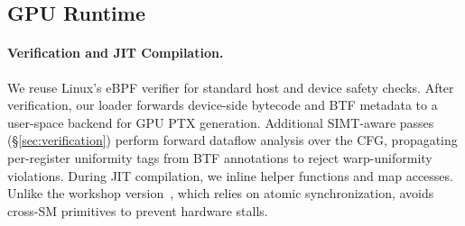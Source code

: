 \subsection{GPU Runtime}
\label{sec:impl-gpu}

\paragraph{Verification and JIT Compilation.}
We reuse Linux's eBPF verifier for standard host and device safety checks.
After verification, our loader forwards device-side bytecode and BTF metadata to a user-space backend for GPU PTX generation.
Additional SIMT-aware passes (\S\ref{sec:verification}) perform forward dataflow analysis over the CFG, propagating per-register uniformity tags from BTF annotations to reject warp-uniformity violations.
During JIT compilation, we inline helper functions and map accesses.
Unlike the workshop version~\cite{egpu}, which relies on atomic synchronization, \sys{} avoids cross-SM primitives to prevent hardware stalls.

